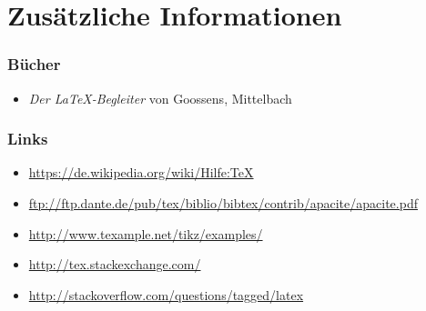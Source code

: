\section{Zusätzliche Informationen}

\begin{frame}
  \frametitle{Bücher}

  \begin{itemize}
   \item \textit{Der LaTeX-Begleiter} von Goossens, Mittelbach
  \end{itemize}
\end{frame}

\begin{frame}
  \frametitle{Links}

  \begin{itemize}
    \item \url{https://de.wikipedia.org/wiki/Hilfe:TeX}
    \item \url{ftp://ftp.dante.de/pub/tex/biblio/bibtex/contrib/apacite/apacite.pdf}
    \item \url{http://www.texample.net/tikz/examples/}
    \item \url{http://tex.stackexchange.com/}
    \item \url{http://stackoverflow.com/questions/tagged/latex}
  \end{itemize}
\end{frame}

